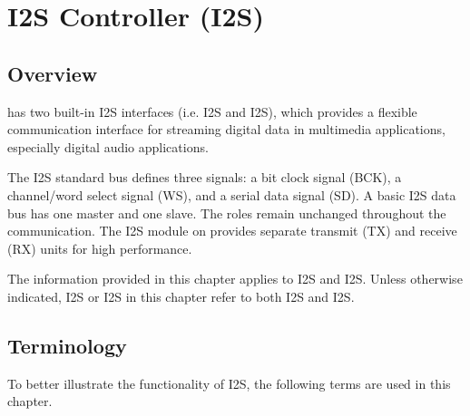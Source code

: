 \documentclass[main\_\_CN.tex]{subfiles}
\begin{document}

\ifglobal
\else
    {\let\clearpage\relax \listoftodos}
    \tableofcontents
\fi




\hypertarget{i2s}{}
\chapter{I2S Controller (I2S)}
\label{mod:i2s}

\section{Overview}
\chipname{} has two built-in I2S interfaces (i.e. I2S and I2S), which provides a flexible communication interface for streaming digital data in multimedia applications, especially digital audio applications.

The I2S standard bus defines three signals: a bit clock signal (BCK), a channel/word select signal (WS), and a serial data signal (SD). A basic I2S data bus has one master and one slave. The roles remain unchanged throughout the communication. The I2S module on \chipname{} provides separate transmit (TX) and receive (RX) units for high performance.

\begin{tiplisting}
The information provided in this chapter applies to I2S and I2S. Unless otherwise indicated, I2S or I2S in this chapter refer to both I2S and I2S.
\end{tiplisting}

\section{Terminology}

To better illustrate the functionality of I2S, the following terms are used in this chapter.
\end{document}
